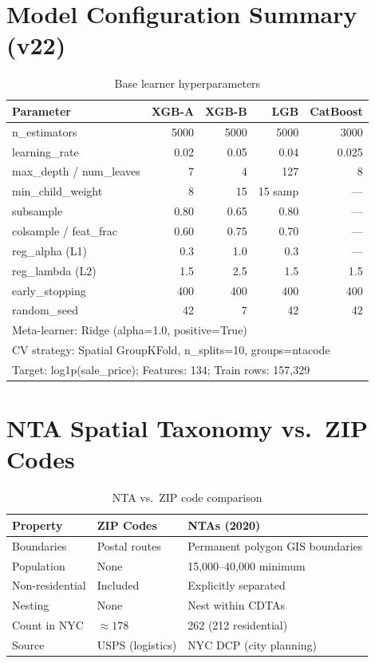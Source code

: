 \documentclass[11pt, a4paper, twoside]{article}
\begin{document}
\section{Model Configuration Summary (v22)}
\label{app:hyperparams}
\begin{table}[H]
  \centering
  \caption{Base learner hyperparameters}
  \label{tab:hyperparams}
  \begin{tabular}{lrrrr}
    \toprule
    Parameter & XGB-A & XGB-B & LGB & CatBoost \\
    \midrule
    n\_estimators      & 5000  & 5000  & 5000  & 3000 \\
    learning\_rate     & 0.02  & 0.05  & 0.04  & 0.025 \\
    max\_depth / num\_leaves & 7 & 4 & 127 & 8 \\
    min\_child\_weight & 8     & 15    & 15 samp & --- \\
    subsample          & 0.80  & 0.65  & 0.80  & --- \\
    colsample / feat\_frac & 0.60 & 0.75 & 0.70 & --- \\
    reg\_alpha (L1)    & 0.3   & 1.0   & 0.3   & --- \\
    reg\_lambda (L2)   & 1.5   & 2.5   & 1.5   & 1.5 \\
    early\_stopping    & 400   & 400   & 400   & 400 \\
    random\_seed       & 42    & 7     & 42    & 42 \\
    \midrule
    \multicolumn{5}{l}{Meta-learner: Ridge (alpha=1.0, positive=True)} \\
    \multicolumn{5}{l}{CV strategy: Spatial GroupKFold, n\_splits=10, groups=ntacode} \\
    \multicolumn{5}{l}{Target: log1p(sale\_price); Features: 134; Train rows: 157,329} \\
    \bottomrule
  \end{tabular}
\end{table}

\section{NTA Spatial Taxonomy vs.\ ZIP Codes}
\label{app:nta_zip}
\begin{table}[H]
  \centering
  \caption{NTA vs.\ ZIP code comparison}
  \label{tab:nta_vs_zip}
  \begin{tabular}{lll}
    \toprule
    Property & ZIP Codes & NTAs (2020) \\
    \midrule
    Boundaries    & Postal routes        & Permanent polygon GIS boundaries \\
    Population    & None                 & 15,000--40,000 minimum \\
    Non-residential & Included           & Explicitly separated \\
    Nesting       & None                 & Nest within CDTAs \\
    Count in NYC  & $\approx 178$        & 262 (212 residential) \\
    Source        & USPS (logistics)     & NYC DCP (city planning) \\
    \bottomrule
  \end{tabular}
\end{table}
\end{document}
